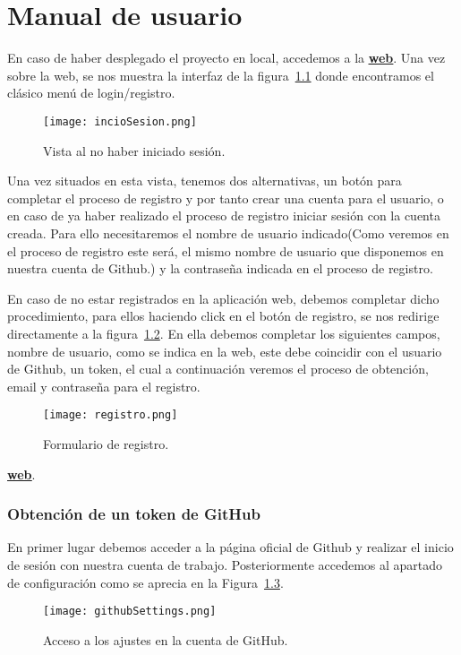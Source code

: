 \chapter{Manual de usuario\label{09manual}}

En caso de haber desplegado el proyecto en local, accedemos a la \textbf{\href{http://localhost:3000}{\underline{web}}}.
Una vez sobre la web, se nos muestra la interfaz de la figura~\ref{figure:inicioSesion} donde encontramos el clásico menú de login/registro.

\begin{figure}[h!]
  \texttt{[image: incioSesion.png]}
  \caption{Vista al no haber iniciado sesión.}
  \label{figure:inicioSesion}
\end{figure}

Una vez situados en esta vista, tenemos dos alternativas, un botón para completar el proceso de registro y por tanto crear una cuenta para el usuario, o en caso de ya haber realizado el proceso de registro iniciar sesión con la cuenta creada. Para ello necesitaremos el nombre de usuario indicado(Como veremos en el proceso de registro este será, el mismo nombre de usuario que disponemos en nuestra cuenta de Github.) y la contraseña indicada en el proceso de registro.


En caso de no estar registrados en la aplicación web, debemos completar dicho procedimiento, para ellos haciendo click en el botón de registro, se nos redirige directamente a la figura~\ref{figure:registro}. En ella debemos completar los siguientes campos, nombre de usuario, como se indica en la web, este debe coincidir con el usuario de Github, un token, el cual a continuación veremos el proceso de obtención, email y contraseña para el registro.

\begin{figure}[h!]
  \texttt{[image: registro.png]}
  \caption{Formulario de registro.}
  \label{figure:registro}
\end{figure}


\textbf{\href{http://localhost:3000}{\underline{web}}}.


\subsection{Obtención de un token de GitHub}

En primer lugar debemos acceder a la página oficial de Github\cite{GitHub} y realizar el inicio de sesión con nuestra cuenta de trabajo. Posteriormente accedemos al apartado de configuración como se aprecia en la Figura~\ref{figure:settingsGitHub}.
\begin{figure}[h!]
  \texttt{[image: githubSettings.png]}
  \caption{Acceso a los ajustes en la cuenta de GitHub.}
  \label{figure:settingsGitHub}
\end{figure}

